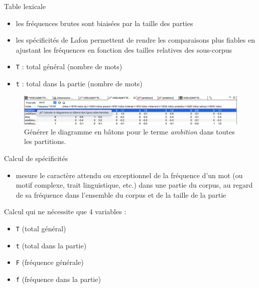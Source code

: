 \documentclass[xetex,xcolor={table,usenames,dvipsnames}]{beamer}
\begin{document}
\begin{frame}{Table lexicale}
	\begin{block}{\vspace{-6mm}}
		\begin{itemize}
				\item les fréquences brutes sont biaisées par la taille des parties
				\item les spécificités de Lafon permettent de rendre les comparaisons plus fiables en ajustant les fréquences en fonction des tailles relatives des sous-corpus
		\end{itemize}
	\end{block}
	\begin{itemize}
		\item \texttt{T} : total général (nombre de mots)
		\item \texttt{t} : total dans la partie (nombre de mots)
	\end{itemize}
	 
	\begin{figure}[h] %
		\centering
		\includegraphics[width=1\linewidth]{img/diagramme_batons.png}
		\caption{Générer le diagramme en bâtons pour le terme \textit{ambition} dans toutes les partitions.}
		\label{fig:ling_out_TAL}
	\end{figure}
\end{frame}

\begin{frame}{Calcul de spécificités \citep{lafon1980variabilite}}
	\begin{block}{\vspace{-6mm}}
		\justifying
		\begin{itemize}
			\item mesure le caractère attendu ou exceptionnel de la fréquence
			d’un mot (ou motif complexe, trait linguistique, etc.) dans une partie du corpus, au regard de sa
			fréquence dans l’ensemble du corpus et de la taille de la partie
		\end{itemize}
	\end{block}
	
	Calcul qui ne nécessite que 4 variables :
	\begin{itemize}
		\item \texttt{T} (total général)
		\item \texttt{t} (total dans la partie)
		\item \texttt{F} (fréquence générale)
		\item \texttt{f} (fréquence dans la partie)
	\end{itemize}
\end{frame}
\end{document}
